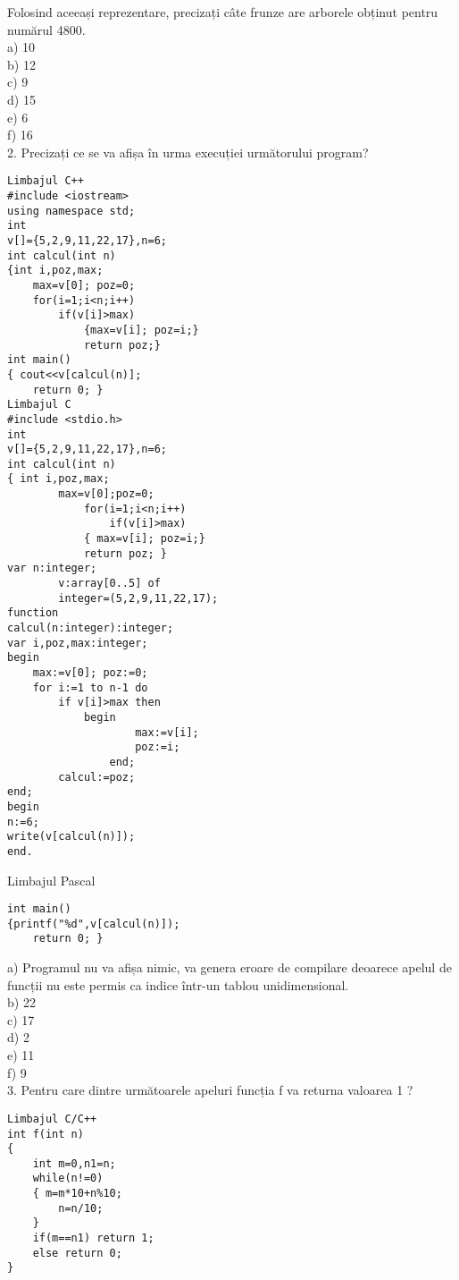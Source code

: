 Folosind aceeași reprezentare, precizați câte frunze are arborele obținut pentru numărul 4800.\\
a) 10\\
b) 12\\
c) 9\\
d) 15\\
e) 6\\
f) 16\\
2. Precizați ce se va afișa în urma execuției următorului program?

\begin{verbatim}
Limbajul C++
#include <iostream>
using namespace std;
int
v[]={5,2,9,11,22,17},n=6;
int calcul(int n)
{int i,poz,max;
    max=v[0]; poz=0;
    for(i=1;i<n;i++)
        if(v[i]>max)
            {max=v[i]; poz=i;}
            return poz;}
int main()
{ cout<<v[calcul(n)];
    return 0; }
Limbajul C
#include <stdio.h>
int
v[]={5,2,9,11,22,17},n=6;
int calcul(int n)
{ int i,poz,max;
        max=v[0];poz=0;
            for(i=1;i<n;i++)
                if(v[i]>max)
            { max=v[i]; poz=i;}
            return poz; }
var n:integer;
        v:array[0..5] of
        integer=(5,2,9,11,22,17);
function
calcul(n:integer):integer;
var i,poz,max:integer;
begin
    max:=v[0]; poz:=0;
    for i:=1 to n-1 do
        if v[i]>max then
            begin
                    max:=v[i];
                    poz:=i;
                end;
        calcul:=poz;
end;
begin
n:=6;
write(v[calcul(n)]);
end.
\end{verbatim}

Limbajul Pascal

\begin{verbatim}
int main()
{printf("%d",v[calcul(n)]);
    return 0; }
\end{verbatim}

a) Programul nu va afișa nimic, va genera eroare de compilare deoarece apelul de funcții nu este permis ca indice într-un tablou unidimensional.\\
b) 22\\
c) 17\\
d) 2\\
e) 11\\
f) 9\\
3. Pentru care dintre următoarele apeluri funcția f va returna valoarea 1 ?

\begin{verbatim}
Limbajul C/C++
int f(int n)
{
    int m=0,n1=n;
    while(n!=0)
    { m=m*10+n%10;
        n=n/10;
    }
    if(m==n1) return 1;
    else return 0;
}
\end{verbatim}

